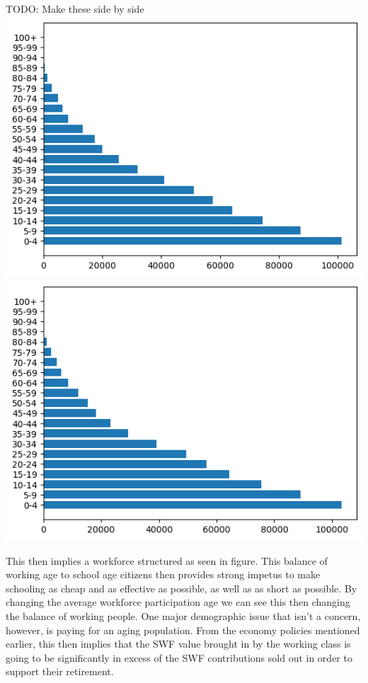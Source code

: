 \documentclass[10pt]{article}
\begin{document}
TODO: Make these side by side
\includegraphics{fig_demopyr_f.png}
\includegraphics{fig_demopyr_m.png}

This then implies a workforce structured as seen in figure. This balance of working age to school age citizens then provides strong impetus to make schooling as cheap and as effective as possible, as well as as short as possible. By changing the average workforce participation age we can see this then changing the balance of working people. One major demographic issue that isn't a concern, however, is paying for an aging population. From the economy policies mentioned earlier, this then implies that the SWF value brought in by the working class is going to be significantly in excess of the SWF contributions sold out in order to support their retirement.
\end{document}

